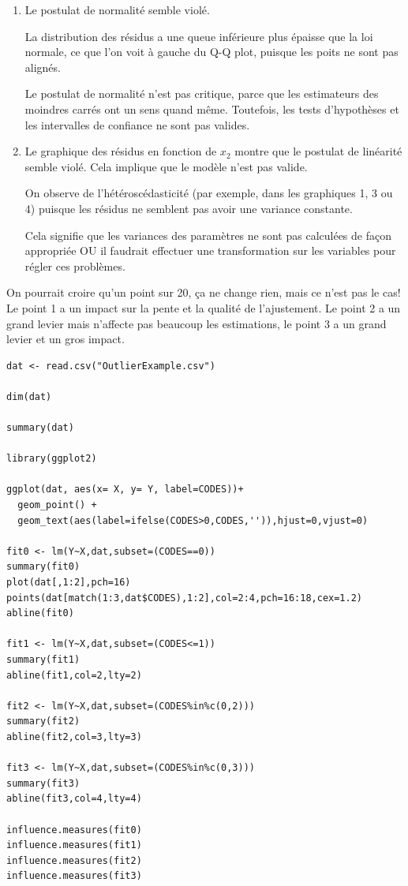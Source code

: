 \begin{solution}{3.19}
\begin{enumerate}
\item Le postulat de normalité semble violé.

La distribution des résidus a une queue inférieure plus épaisse que la loi normale, ce que l'on voit à gauche du Q-Q plot, puisque les poits ne sont pas alignés.

Le postulat de normalité n'est pas critique, parce que les estimateurs des moindres carrés ont un sens quand même. Toutefois, les tests d'hypothèses et les intervalles de confiance ne sont pas valides.

\item Le graphique des résidus en fonction de $x_2$ montre que le postulat de linéarité semble violé. Cela implique que le modèle n'est pas valide.

On observe de l'hétéroscédasticité (par exemple, dans les graphiques 1, 3 ou 4) puisque les résidus ne semblent pas avoir une variance constante.

Cela signifie que les variances des paramètres ne sont pas calculées de façon appropriée OU il faudrait effectuer une transformation sur les variables pour régler ces problèmes.


\end{enumerate}
\end{solution}
\begin{solution}{3.20}
On pourrait croire qu'un point sur 20, ça ne change rien, mais ce n'est pas le cas! Le point 1 a un impact sur la pente et la qualité de l'ajustement. Le point 2 a un grand levier mais n'affecte pas beaucoup les estimations, le point 3 a un grand levier et un gros impact.

\begin{verbatim}
dat <- read.csv("OutlierExample.csv")

dim(dat)

summary(dat)

library(ggplot2)

ggplot(dat, aes(x= X, y= Y, label=CODES))+
  geom_point() +
  geom_text(aes(label=ifelse(CODES>0,CODES,'')),hjust=0,vjust=0)

fit0 <- lm(Y~X,dat,subset=(CODES==0))
summary(fit0)
plot(dat[,1:2],pch=16)
points(dat[match(1:3,dat$CODES),1:2],col=2:4,pch=16:18,cex=1.2)
abline(fit0)

fit1 <- lm(Y~X,dat,subset=(CODES<=1))
summary(fit1)
abline(fit1,col=2,lty=2)

fit2 <- lm(Y~X,dat,subset=(CODES%in%c(0,2)))
summary(fit2)
abline(fit2,col=3,lty=3)

fit3 <- lm(Y~X,dat,subset=(CODES%in%c(0,3)))
summary(fit3)
abline(fit3,col=4,lty=4)

influence.measures(fit0)
influence.measures(fit1)
influence.measures(fit2)
influence.measures(fit3)

\end{verbatim}
\end{solution}
